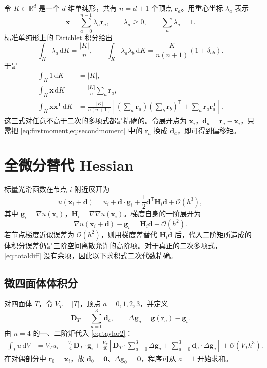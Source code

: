 \documentclass[UTF8,a4paper,11pt,openany]{ctexrep}
\numberwithin{equation}{chapter}
\newcommand{\dd}{\,\mathrm d}
\newcommand{\Order}{\mathcal O}
\newcommand{\grad}{\nabla}
\newcommand{\transpose}{\mathsf T}
\begin{document}
令 $K\subset\mathbb R^d$ 是一个 $d$ 维单纯形，共有 $n=d+1$ 个顶点 $\bm r_a$。用重心坐标 $\lambda_a$ 表示
\begin{equation}
  \bm x=\sum_{a=0}^{n-1}\lambda_a\bm r_a,
  \qquad \lambda_a\ge 0,
  \qquad \sum_a\lambda_a=1.
\end{equation}
标准单纯形上的 Dirichlet 积分给出
\begin{equation}
  \int_K\lambda_a\dd K=\frac{|K|}{n},\qquad
  \int_K\lambda_a\lambda_b\dd K
  =\frac{|K|}{n(n+1)}(1+\delta_{ab}).
\end{equation}
于是
\begin{align}
  \int_K 1\dd K &= |K|,\\
  \int_K\bm x\dd K &= \frac{|K|}{n}\sum_a\bm r_a,\label{eq:firstmoment}\\
  \int_K\bm x\bm x^{\transpose}\dd K
  &=\frac{|K|}{n(n+1)}\left[
    \left(\sum_a\bm r_a\right)\left(\sum_b\bm r_b\right)^{\transpose}
    +\sum_a\bm r_a\bm r_a^{\transpose}
  \right].\label{eq:secondmoment}
\end{align}
这三式对任意不高于二次的多项式都是精确的。令展开点为 $\bm x_i$，$\bm d_a=\bm r_a-\bm x_i$，只需把 \cref{eq:firstmoment,eq:secondmoment} 中的 $\bm r_a$ 换成 $\bm d_a$，即可得到偏移矩。

\section{全微分替代 Hessian}

标量光滑函数在节点 $i$ 附近展开为
\begin{equation}
  u(\bm x_i+\bm d)=u_i+\bm d\cdot\bm g_i
  +\frac12\bm d^{\transpose}\bm H_i\bm d+\Order(h^3),
  \label{eq:taylor2}
\end{equation}
其中 $\bm g_i=\grad u(\bm x_i)$，$\bm H_i=\grad\grad u(\bm x_i)$。梯度自身的一阶展开为
\begin{equation}
  \grad u(\bm x_i+\bm d)-\bm g_i
  =\bm H_i\bm d+\Order(h^2).
  \label{eq:totaldiff}
\end{equation}
若节点梯度近似误差为 $\Order(h^2)$，则用梯度差替代 $\bm H_i\bm d$ 后，代入二阶矩所造成的体积分误差仍是三阶空间离散允许的高阶项。对于真正的二次多项式，\cref{eq:totaldiff} 没有余项，因此以下求积式二次代数精确。

\subsection{微四面体体积分}

对四面体 $T$，令 $V_T=|T|$，顶点 $a=0,1,2,3$，并定义
\begin{equation}
  \bm D_T=\sum_{a=0}^{3}\bm d_a,
  \qquad
  \Delta\bm g_a=\bm g(\bm r_a)-\bm g_i.
\end{equation}
由 $n=4$ 的一、二阶矩代入 \cref{eq:taylor2}：
\begin{align}
  \int_T u\dd V
  &=V_Tu_i+\frac{V_T}{4}\bm D_T\cdot\bm g_i
  +\frac{V_T}{40}\left[
       \bm D_T\cdot\sum_{a=0}^{3}\Delta\bm g_a
       +\sum_{a=0}^{3}\bm d_a\cdot\Delta\bm g_a
    \right]
  +\Order(V_Th^3).
  \label{eq:tetquad}
\end{align}
在对偶剖分中 $\bm r_0=\bm x_i$，故 $\bm d_0=\bm 0$、$\Delta\bm g_0=\bm0$，程序可从 $a=1$ 开始求和。
\end{document}
